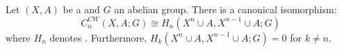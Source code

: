 \begin{lemma} \label{lemma:relative_cellular_chain_group_of_CW_pair_with_coefficients_in_an_abelian_group_is_isomorphic_to_a_singular_homology_group}
Let $(X, A)$ be a  and $G$ an abelian group. There is a canonical isomorphism:
$$C_n^{CW}(X, A; G) \cong H_n(X^n \cup A, X^{n-1} \cup A; G)$$
 where $H_n$ denotes . Furthermore, $H_k(X^n \cup A, X^{n-1} \cup A; G) = 0$ for $k \neq n$.
\end{lemma}